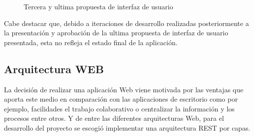 \documentclass[11pt,a4paper]{article}
\begin{document}
\begin{figure}[H]
\centering
{}
\caption{Tercera y ultima propuesta de interfaz de usuario}
\end{figure}

Cabe destacar que, debido a iteraciones de desarrollo realizadas posteriormente a la presentación y aprobación de la ultima propuesta de interfaz de usuario presentada, esta no refleja el estado final de la aplicación.
\bigskip 

\subsection{Arquitectura WEB}
La decisión de realizar una aplicación Web viene motivada por las ventajas que aporta este medio en comparación con las aplicaciones de escritorio como por ejemplo, facilidades el trabajo colaborativo o centralizar la información y los procesos entre otros. Y de entre las diferentes arquitecturas Web, para el desarrollo del proyecto se escogió implementar una arquitectura REST por capas.
\\
\end{document}
